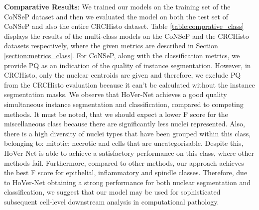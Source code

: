\documentclass[journal]{IEEEtran}
\begin{document}
	\textbf{Comparative Results}: We trained our models on the training set of the CoNSeP dataset and then we evaluated the model on both the test set of CoNSeP and also the entire CRCHisto dataset. Table \ref{table:comprative_class} displays the results of the multi-class models on the CoNSeP and the CRCHisto datasets respectively, where the given metrics are described in Section \ref{section:metrics_class}. For CoNSeP, along with the classification metrics, we provide PQ as an indication of the quality of instance segmentation. However, in CRCHisto, only the nuclear centroids are given and therefore, we exclude PQ from the CRCHisto evaluation because it can't be calculated without the instance segmentation masks. We observe that HoVer-Net achieves a good quality simultaneous instance segmentation and classification, compared to competing methods. It must be noted, that we should expect a lower F score for the miscellaneous class because there are significantly less nuclei represented. Also, there is a high diversity of nuclei types that have been grouped within this class, belonging to: mitotic; necrotic and cells that are uncategorisable. Despite this, HoVer-Net is able to achieve a satisfactory performance on this class, where other methods fail. Furthermore, compared to other methods, our approach achieves the best F score for epithelial, inflammatory and spindle classes. Therefore, due to HoVer-Net obtaining a strong performance for both nuclear segmentation and classification, we suggest that our model may be used for sophisticated subsequent cell-level downstream analysis in computational pathology. 
	
	
\end{document}
